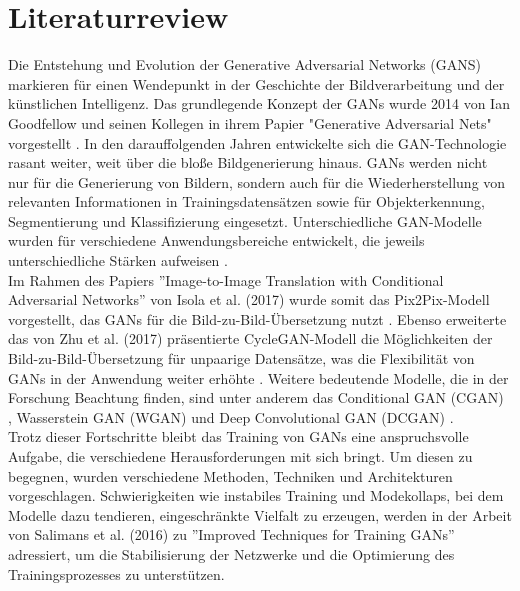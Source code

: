 \chapter{Literaturreview}

Die Entstehung und Evolution der Generative Adversarial Networks (GANS) markieren für einen Wendepunkt in der Geschichte der Bildverarbeitung und der künstlichen Intelligenz. Das grundlegende Konzept der GANs wurde 2014 von Ian Goodfellow und seinen Kollegen in ihrem Papier "Generative Adversarial Nets" vorgestellt \cite{IanJ.GoodfellowJeanPougetAbadieMehdiMirzaBingXuDavidWardeFarleySherjilOzairAaro.2014}.\newline
In den darauffolgenden Jahren entwickelte sich die GAN-Technologie rasant weiter, weit über die bloße Bildgenerierung hinaus. GANs werden nicht nur für die Generierung von Bildern, sondern auch für die Wiederherstellung von relevanten Informationen in Trainingsdatensätzen sowie für Objekterkennung, Segmentierung und Klassifizierung eingesetzt. Unterschiedliche GAN-Modelle wurden für verschiedene Anwendungsbereiche entwickelt, die jeweils unterschiedliche Stärken aufweisen \cite{Aggarwal.2021}.
\\\newline
Im Rahmen des Papiers ''Image-to-Image Translation with Conditional Adversarial Networks'' von Isola et al. (2017) wurde somit das Pix2Pix-Modell vorgestellt, das GANs für die Bild-zu-Bild-Übersetzung nutzt \cite{PhillipIsola.}. Ebenso erweiterte das von Zhu et al. (2017) präsentierte CycleGAN-Modell die Möglichkeiten der Bild-zu-Bild-Übersetzung für unpaarige Datensätze, was die Flexibilität von GANs in der Anwendung weiter erhöhte \cite{Zhu.2017}. Weitere bedeutende Modelle, die in der Forschung Beachtung finden, sind unter anderem das Conditional GAN (CGAN) \cite{Mirza.2014}, Wasserstein GAN (WGAN) \cite{Arjovsky.2017} und Deep Convolutional GAN (DCGAN) \cite{Krizhevsky.2017}.
\\\newline
Trotz dieser Fortschritte bleibt das Training von GANs eine anspruchsvolle Aufgabe, die verschiedene Herausforderungen mit sich bringt. Um diesen zu begegnen, wurden verschiedene Methoden, Techniken und Architekturen vorgeschlagen. Schwierigkeiten wie instabiles Training und Modekollaps, bei dem Modelle dazu tendieren, eingeschränkte Vielfalt zu erzeugen, werden in der Arbeit von Salimans et al. (2016) \cite{Salimans.2016} zu ''Improved Techniques for Training GANs'' adressiert, um die Stabilisierung der Netzwerke und die Optimierung des Trainingsprozesses zu unterstützen.
